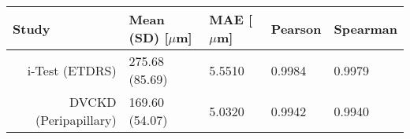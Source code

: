 
\begin{tabular}{rllll}
\toprule
\multicolumn{1}{l}{Study} & Mean (\acrshort{SD}) [$\mu$m] & \acrshort{MAE} [$\mu$m] & Pearson & Spearman \\
\midrule
\multirow{1}{*}{i-Test (\acrshort{ETDRS})} & 275.68 (85.69) & 5.5510 & 0.9984 & 0.9979\\
\multirow{1}{*}{\acrshort{DVCKD} (Peripapillary)} & 169.60 (54.07) & 5.0320 & 0.9942 & 0.9940 \\
 \bottomrule
\end{tabular}
